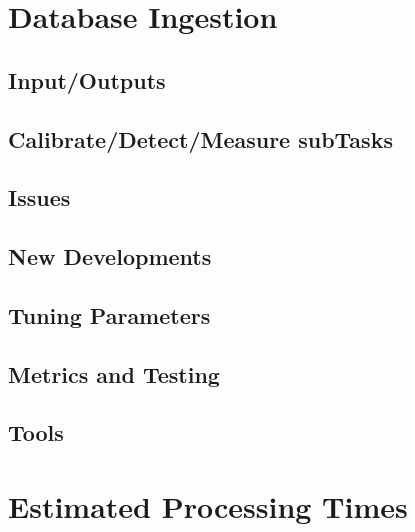 \documentclass[12pt]{article}
\begin{document}

\clearpage 
\section{Database Ingestion} 

\subsection{Input/Outputs}
\subsection{Calibrate/Detect/Measure subTasks}
\subsection{Issues}
\subsection{New Developments}
\subsection{Tuning Parameters}
\subsection{Metrics and Testing}
\subsection{Tools}


\clearpage 
\section{Estimated Processing Times} 
\end{document}
